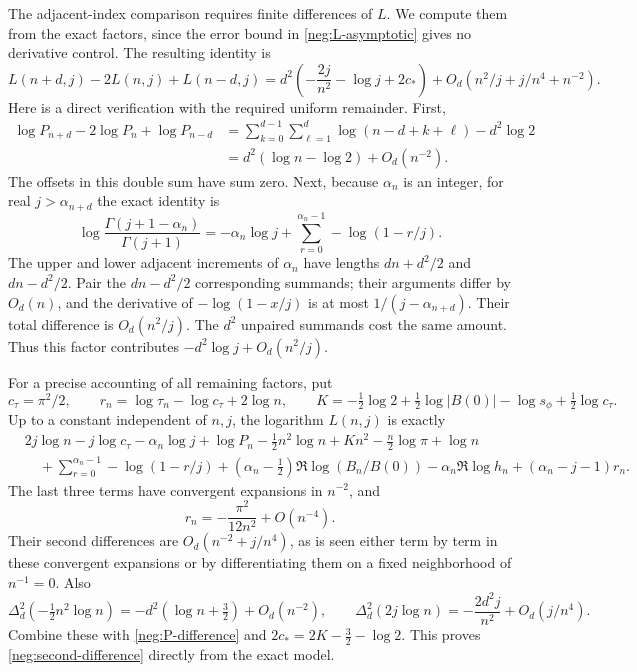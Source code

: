 \documentclass[11pt]{article}
\numberwithin{equation}{section}
\theoremstyle{definition}
\begin{document}
The adjacent-index comparison requires finite differences of
\(L\). We compute them from the exact factors, since the error
bound in \eqref{neg:L-asymptotic} gives no derivative control.
The resulting identity is
\begin{equation}
 L(n+d,j)-2L(n,j)+L(n-d,j)
 =d^2\left(-\frac{2j}{n^2}-\log j+2c_*\right)
    +O_d(n^2/j+j/n^4+n^{-2}).
 \label{neg:second-difference}
\end{equation}
Here is a direct verification with the required uniform
remainder.  First,
\begin{align}
 \log P_{n+d}-2\log P_n+\log P_{n-d}
 &=\sum_{k=0}^{d-1}\sum_{\ell=1}^{d}
        \log(n-d+k+\ell)-d^2\log2\\
 &=d^2(\log n-\log2)+O_d(n^{-2}).
 \label{neg:P-difference}
\end{align}
The offsets in this double sum have sum zero.
Next, because \(\alpha_n\) is an integer, for real
\(j>\alpha_{n+d}\) the exact identity is
\[
 \log\frac{\Gamma(j+1-\alpha_n)}{\Gamma(j+1)}
 =-\alpha_n\log j+
      \sum_{r=0}^{\alpha_n-1}-\log(1-r/j).
 \]
The upper and lower adjacent increments of \(\alpha_n\)
have lengths \(dn+d^2/2\) and \(dn-d^2/2\).
Pair the \(dn-d^2/2\) corresponding summands; their
arguments differ by \(O_d(n)\), and the derivative of
\(-\log(1-x/j)\) is at most
\(1/(j-\alpha_{n+d})\).
Their total difference is \(O_d(n^2/j)\).
The \(d^2\) unpaired summands cost the same amount.
Thus this factor contributes
\(-d^2\log j+O_d(n^2/j)\).

For a precise accounting of all remaining factors, put
\[
 c_\tau=\pi^2/2,\qquad
 r_n=\log\tau_n-\log c_\tau+2\log n,\qquad
 K=-\tfrac12\log2+\tfrac12\log|B(0)|
                      -\log s_\phi+\tfrac12\log c_\tau .
 \]
Up to a constant independent of \(n,j\), the logarithm
\(L(n,j)\) is exactly
\begin{align*}
 &2j\log n-j\log c_\tau-\alpha_n\log j
   +\log P_n-\tfrac12n^2\log n+Kn^2
                 -\tfrac n2\log\pi+\log n\\
 &\quad+
 \sum_{r=0}^{\alpha_n-1}-\log(1-r/j)
 +(\alpha_n-\tfrac12)\Re\log(B_n/B(0))
 -\alpha_n\Re\log h_n+(\alpha_n-j-1)r_n .
\end{align*}
The last three terms have convergent expansions in \(n^{-2}\),
and
\[
 r_n=-\frac{\pi^2}{12n^2}+O(n^{-4}).
 \]
Their second differences are
\(O_d(n^{-2}+j/n^4)\), as is seen either term by term in
these convergent expansions or by differentiating them on
a fixed neighborhood of \(n^{-1}=0\).
Also
\[
 \Delta_d^2(-\tfrac12n^2\log n)
     =-d^2(\log n+\tfrac32)+O_d(n^{-2}),\qquad
 \Delta_d^2(2j\log n)
     =-\frac{2d^2j}{n^2}+O_d(j/n^4).
 \]
Combine these with \eqref{neg:P-difference} and
\(2c_*=2K-\tfrac32-\log2\).  This proves
\eqref{neg:second-difference} directly from the exact
model.
\end{document}
